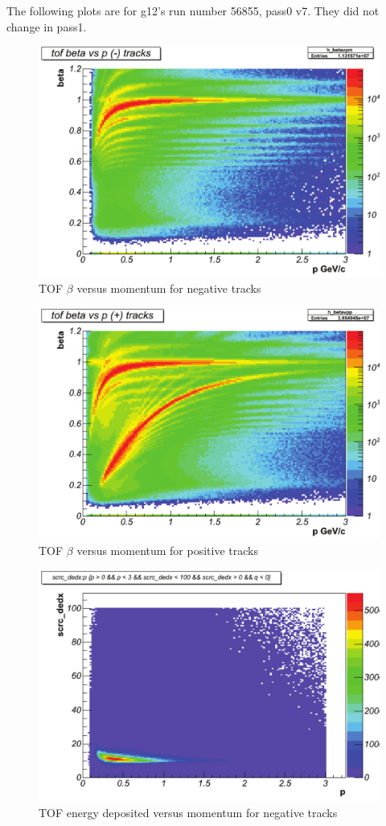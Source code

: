 The following plots are for g12's run number 56855, pass0 v7. They did not change in pass1. 

\begin{figure}\begin{center}
    \includegraphics[width=.40\linewidth]{figures/calib/tof/Tof_56855_final_betavpm.pdf}
    \caption{TOF $\beta$ versus momentum for negative tracks}
    \label{plt:tofbetavpneg}
\end{center}\end{figure}

\begin{figure}\begin{center}
    \includegraphics[width=.40\linewidth]{figures/calib/tof/Tof_56855_final_betavpp.pdf}
    \caption{TOF $\beta$ versus momentum for positive tracks}
    \label{plt:tofbetavppos}
\end{center}\end{figure}

\begin{figure}\begin{center}
    \includegraphics[width=.40\linewidth]{figures/calib/tof/Tof_56855_final_dedxm.pdf}
    \caption{TOF energy deposited versus momentum for negative tracks}
    \label{plt:tofEvpneg}
\end{center}\end{figure}

